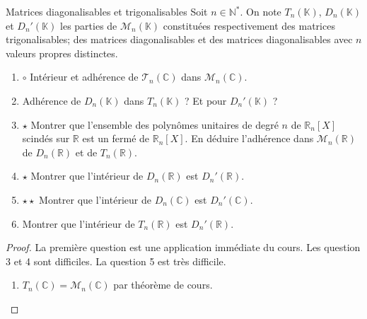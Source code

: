 \documentclass[french,a4paper]{article}
\newcommand{\N}{\mathbb{N}}
\newcommand{\R}{\mathbb{R}}
\newcommand{\C}{\mathbb{C}}
\newcommand{\K}{\mathbb{K}}
\newcommand{\st}{^*}
\theoremstyle{plain}
\theoremstyle{definition}
\theoremstyle{remark}
\begin{document}
\begin{ex}{Matrices diagonalisables et trigonalisables}
	Soit $n\in\N\st$. On note $T_n(\K)$, $D_n(\K)$ et $D_n'(\K)$ les parties de $\mathcal{M}_n(\K)$ constituées respectivement des matrices trigonalisables; des matrices diagonalisables et des matrices diagonalisables avec $n$ valeurs propres distinctes.
	\begin{enumerate}
		\item $\circ$ Intérieur et adhérence de $\mathcal{T}_n(\C)$ dans $\mathcal{M}_n(\C)$.
		\item Adhérence de $D_n(\K)$ dans $T_n(\K)$ ? Et pour $D_n'(\K)$ ?
		\item $\star$ Montrer que l'ensemble des polynômes unitaires de degré $n$ de $\R_n[X]$ scindés sur $\R$ est un fermé de $\R_n[X]$. En déduire l'adhérence dans $\mathcal{M}_n(\R)$ de $D_n(\R)$ et de $T_n(\R)$.
		\item $\star$ Montrer que l'intérieur de $D_n(\R)$ est $D_n'(\R)$.
		\item $\star\star$ Montrer que l'intérieur de $D_n(\C)$ est $D_n'(\C)$. %
		\item Montrer que l'intérieur de $T_n(\R)$ est $D_n'(\R)$.
	\end{enumerate}
\end{ex}
\begin{proof}
	La première question est une application immédiate du cours. Les question 3 et 4 sont difficiles. La question 5 est très difficile.
	\begin{enumerate}
		\item $T_n(\C)=\mathcal{M}_n(\C)$ par théorème de cours.
	\end{enumerate}
\end{proof}
\end{document}
